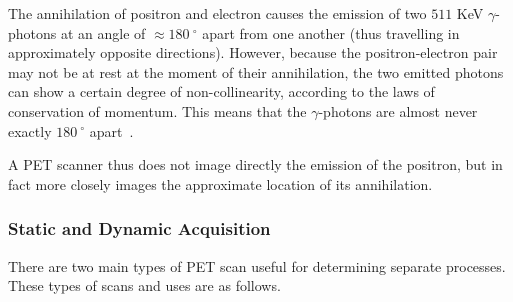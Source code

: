                 The annihilation of positron and electron causes the emission of two $511$ \gls{KeV} $\gamma$-photons at an angle of $\approx\SI{180}{^{\circ}}$ apart from one another (thus travelling in approximately opposite directions). However, because the positron-electron pair may not be at rest at the moment of their annihilation, the two emitted photons can show a certain degree of non-collinearity, according to the laws of conservation of momentum. This means that the $\gamma$-photons are almost never exactly $\SI{180}{^{\circ}}$ apart~\parencite{scienceofpetspringer}. %
                
                A \gls{PET} scanner thus does not image directly the emission of the positron, but in fact more closely images the approximate location of its annihilation. %
            
            \subsubsection{Static and Dynamic Acquisition} \label{sec:static_and_dynamic_acquisition}
                There are two main types of \gls{PET} scan useful for determining separate processes. These types of scans and uses are as follows.
                
